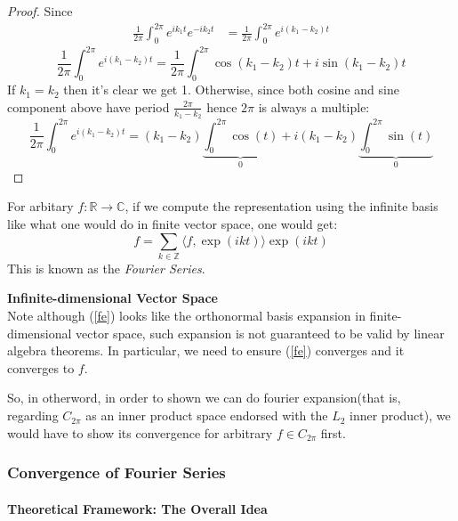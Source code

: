 \begin{proof}Since
\begin{equation}
\begin{aligned}
\frac{1}{2\pi}\int_0^{2\pi}e^{ik_1t}e^{-ik_2t} &= \frac{1}{2\pi}\int_0^{2\pi}e^{i(k_1-k_2)t}
\end{aligned}
\end{equation}
\begin{equation}
\frac{1}{2\pi}\int_0^{2\pi}e^{i(k_1-k_2)t} = \frac{1}{2\pi}\int_0^{2\pi}\cos(k_1-k_2)t + i\sin(k_1-k_2)t
\end{equation}
If $k_1=k_2$ then it's clear we get 1. Otherwise, since both cosine and sine component above have period $\frac{2\pi}{k_1 -k_2}$ hence $2\pi$ is always a multiple:
\begin{equation}
\frac{1}{2\pi}\int_0^{2\pi}e^{i(k_1-k_2)t}=(k_1-k_2)\underbrace{\int_0^{2\pi}\cos(t)}_{0}+i(k_1-k_2)\underbrace{\int_0^{2\pi} \sin(t)}_{0}
\end{equation}

\end{proof}For arbitary $f:\mathbb{R}\to \mathbb{C}$, if we compute the representation using the infinite basis like what one would do in finite vector space, one would get:
\begin{equation}
\label{fe}
f=\sum_{k\in\mathbb{Z}}\langle f, \exp(ikt)\rangle \exp(ikt)
\end{equation}
This is known as the \textit{Fourier Series}.

\begin{framed}
\textbf{Infinite-dimensional Vector Space}\\
Note although (\ref{fe}) looks like the orthonormal basis expansion in finite-dimensional vector space, such expansion is not guaranteed to be valid by linear algebra theorems. In particular, we need to ensure (\ref{fe}) converges and it converges to $f$.
\end{framed}

So, in otherword, in order to shown we can do fourier expansion(that is, regarding $C_{2\pi}$ as an inner product space endorsed with the $L_2$ inner product), we would have to show its convergence for arbitrary $f\in C_{2\pi}$ first.

\subsubsection{Convergence of Fourier Series}

\paragraph{Theoretical Framework: The Overall Idea}

